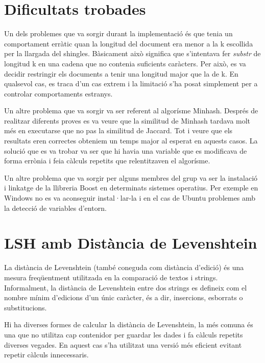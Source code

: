 \documentclass[catalan, 12pt]{report}
\begin{document}
\section{Dificultats trobades}

Un dels problemes que va sorgir durant la implementació és que tenia un comportament erràtic quan la longitud del document era menor a la k escollida per la llargada del shingles. Bàsicament això significa que s'intentava fer \textit{substr} de longitud k en una cadena que no contenia suficients caràcters. Per això, es va decidir restringir els documents a tenir una longitud major que la de k. En qualsevol cas, es traca d'un cas extrem i la limitació s'ha posat simplement per a controlar comportaments estranys. \newline

Un altre problema que va sorgir va ser referent al algorísme Minhash. Després de realitzar diferents proves es va veure que la similitud de Minhash tardava molt més en executarse que no pas la similitud de Jaccard. Tot i veure que els resultats eren correctes obteniem un temps major al esperat en aquests casos. La solució que es va trobar va ser que hi havia una variable que es modificava de forma errònia i feia càlculs repetits que relentitzaven el algorísme.

Un altre problema que va sorgir per alguns membres del grup va ser la instalació i linkatge de la llibreria Boost en determinats sistemes operatius. Per exemple en Windows no es va aconseguir instal·lar-la i en el cas de Ubuntu problemes amb la detecció de variables d'entorn.

\section{LSH amb Distància de Levenshtein}

La distància de Levenshtein (també coneguda com distància d'edició) és una mesura freqüentment utilitzada en la comparació de textos i strings. Informalment, la distància de Levenshtein entre dos strings es defineix com el nombre mínim d'edicions d'un únic caràcter, és a dir, insercions, esborrats o substitucions. \newline

Hi ha diverses formes de calcular la distància de Levenshtein, la més comuna és una que no utilitza cap contenidor per guardar les dades i fa càlculs repetits diverses vegades. En aquest cas s'ha utilitzat una versió més eficient evitant repetir càlculs innecessaris.   \newline
\end{document}
